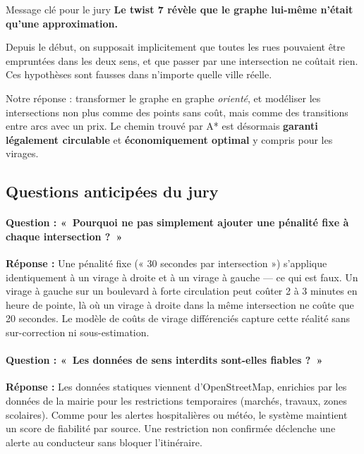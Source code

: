 \documentclass[12pt,a4paper]{article}
\theoremstyle{definition}
\theoremstyle{remark}
\begin{document}
\begin{jurybox}{Message clé pour le jury}
\textbf{Le twist 7 révèle que le graphe lui-même n'était qu'une approximation.}

\medskip
Depuis le début, on supposait implicitement que toutes les rues
pouvaient être empruntées dans les deux sens, et que passer par
une intersection ne coûtait rien. Ces hypothèses sont fausses dans
n'importe quelle ville réelle.

\medskip
Notre réponse : transformer le graphe en graphe \emph{orienté},
et modéliser les intersections non plus comme des points sans coût,
mais comme des transitions entre arcs avec un prix. Le chemin
trouvé par A* est désormais \textbf{garanti légalement
circulable} et \textbf{économiquement optimal} y compris
pour les virages.
\end{jurybox}

\subsection{Questions anticipées du jury}

\paragraph{Question : «~Pourquoi ne pas simplement ajouter une pénalité
fixe à chaque intersection ?~»}

\noindent\textbf{Réponse :} Une pénalité fixe (« 30 secondes par
intersection ») s'applique identiquement à un virage à droite et à un
virage à gauche — ce qui est faux. Un virage à gauche sur un boulevard
à forte circulation peut coûter 2 à 3 minutes en heure de pointe, là où
un virage à droite dans la même intersection ne coûte que 20 secondes.
Le modèle de coûts de virage différenciés capture cette réalité
sans sur-correction ni sous-estimation.

\paragraph{Question : «~Les données de sens interdits sont-elles
fiables ?~»}

\noindent\textbf{Réponse :} Les données statiques viennent d'OpenStreetMap,
enrichies par les données de la mairie pour les restrictions temporaires
(marchés, travaux, zones scolaires). Comme pour les alertes hospitalières
ou météo, le système maintient un score de fiabilité par source. Une
restriction non confirmée déclenche une alerte au conducteur sans bloquer
l'itinéraire.
\end{document}
